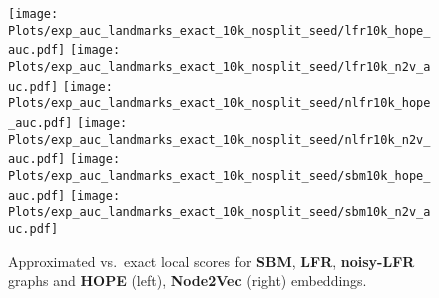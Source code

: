  \clearpage


 \begin{figure}[ht]
     \centering
     \texttt{[image: Plots/exp\_auc\_landmarks\_exact\_10k\_nosplit\_seed/lfr10k\_hope\_auc.pdf]}
         \hspace{.1cm}
     \texttt{[image: Plots/exp\_auc\_landmarks\_exact\_10k\_nosplit\_seed/lfr10k\_n2v\_auc.pdf]}
     \vspace{.1cm}
     \texttt{[image: Plots/exp\_auc\_landmarks\_exact\_10k\_nosplit\_seed/nlfr10k\_hope\_auc.pdf]}
         \hspace{.1cm}
     \texttt{[image: Plots/exp\_auc\_landmarks\_exact\_10k\_nosplit\_seed/nlfr10k\_n2v\_auc.pdf]}
     \vspace{.1cm}
     \texttt{[image: Plots/exp\_auc\_landmarks\_exact\_10k\_nosplit\_seed/sbm10k\_hope\_auc.pdf]}
         \hspace{.1cm}
     \texttt{[image: Plots/exp\_auc\_landmarks\_exact\_10k\_nosplit\_seed/sbm10k\_n2v\_auc.pdf]}
     \caption{Approximated vs.\ exact local scores for \textbf{SBM}, \textbf{LFR}, \textbf{noisy-LFR} graphs and \textbf{HOPE} (left), \textbf{Node2Vec} (right) embeddings.}
     \label{fig:10kapprox_exact_aucseed}
 \end{figure}





